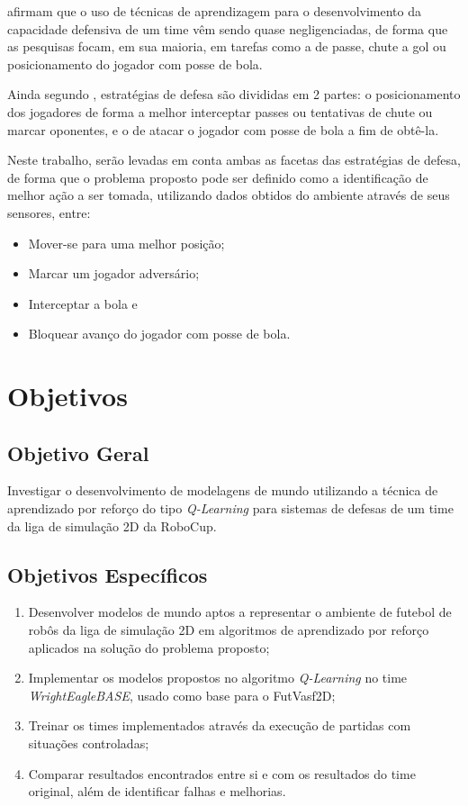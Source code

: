  afirmam que o uso de técnicas de aprendizagem para o desenvolvimento da
capacidade defensiva de um time vêm sendo quase negligenciadas, de forma que as pesquisas focam, em
sua maioria, em tarefas como a de passe, chute a gol ou posicionamento do jogador com posse de bola.

Ainda segundo , estratégias de defesa são divididas em 2 partes: o
posicionamento dos jogadores de forma a melhor interceptar passes ou tentativas de chute ou marcar
oponentes, e o de atacar o jogador com posse de bola a fim de obtê-la.

Neste trabalho, serão levadas em conta ambas as facetas das estratégias de defesa, de forma que o
problema proposto pode ser definido como a identificação de melhor ação a ser tomada, utilizando
dados obtidos do ambiente através de seus sensores, entre:

\begin{itemize}
    \item Mover-se para uma melhor posição;
    \item Marcar um jogador adversário; 
    \item Interceptar a bola e
    \item Bloquear avanço do jogador com posse de bola.
\end{itemize}

\section{Objetivos}

\subsection{Objetivo Geral}

Investigar o desenvolvimento de modelagens de mundo utilizando a técnica de
aprendizado por reforço do tipo \textit{Q-Learning} para sistemas de defesas de
um time da liga de simulação 2D da RoboCup.

\subsection{Objetivos Específicos}

\begin{enumerate}
    \item Desenvolver modelos de mundo aptos a representar o ambiente de futebol de robôs da liga de
    simulação 2D em algoritmos de aprendizado por reforço aplicados na solução do problema proposto;
    
    \item Implementar os modelos propostos no algoritmo \textit{Q-Learning} no time
    \textit{WrightEagleBASE}, usado como base para o FutVasf2D;
    
    \item Treinar os times implementados através da execução de partidas com situações controladas;
    
    \item Comparar resultados encontrados entre si e com os resultados do time
    original, além de identificar falhas e melhorias.
\end{enumerate}

